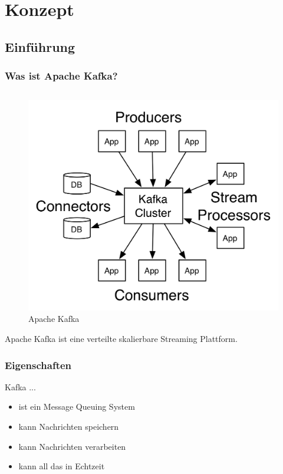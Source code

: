 \section{Konzept}
\subsection{Einführung}
\begin{frame}
\frametitle{Was ist Apache Kafka?}
\begin{columns}[T]
	\begin{column}[T]{0.49\textwidth}
		
	\end{column}
	\begin{column}[T]{0.49\textwidth}
		
\end{column}
\end{columns}

\centering
\begin{figure}[h]
	\includegraphics[scale=0.7]{figure/kafka-apis.png}
	\caption{Apache Kafka~\cite{Kafka}}
\end{figure}

Apache Kafka ist eine verteilte skalierbare Streaming Plattform.

\end{frame}


\begin{frame}
\frametitle{Eigenschaften}
Kafka ...
\begin{itemize}
	\item ist ein Message Queuing System
	\item kann Nachrichten speichern
	\item kann Nachrichten verarbeiten
	\item kann all das in Echtzeit
\end{itemize}

\end{frame}


